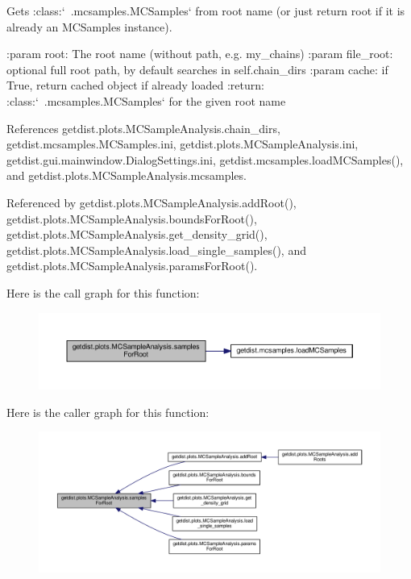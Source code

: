 \begin{DoxyVerb}Gets :class:`~.mcsamples.MCSamples` from root name (or just return root if it is already an MCSamples instance).

:param root: The root name (without path, e.g. my_chains)
:param file_root: optional full root path, by default searches in self.chain_dirs
:param cache: if True, return cached object if already loaded
:return: :class:`~.mcsamples.MCSamples` for the given root name
\end{DoxyVerb}
 

References getdist.\+plots.\+M\+C\+Sample\+Analysis.\+chain\+\_\+dirs, getdist.\+mcsamples.\+M\+C\+Samples.\+ini, getdist.\+plots.\+M\+C\+Sample\+Analysis.\+ini, getdist.\+gui.\+mainwindow.\+Dialog\+Settings.\+ini, getdist.\+mcsamples.\+load\+M\+C\+Samples(), and getdist.\+plots.\+M\+C\+Sample\+Analysis.\+mcsamples.



Referenced by getdist.\+plots.\+M\+C\+Sample\+Analysis.\+add\+Root(), getdist.\+plots.\+M\+C\+Sample\+Analysis.\+bounds\+For\+Root(), getdist.\+plots.\+M\+C\+Sample\+Analysis.\+get\+\_\+density\+\_\+grid(), getdist.\+plots.\+M\+C\+Sample\+Analysis.\+load\+\_\+single\+\_\+samples(), and getdist.\+plots.\+M\+C\+Sample\+Analysis.\+params\+For\+Root().

Here is the call graph for this function\+:
\nopagebreak
\begin{figure}[H]
\begin{center}
\leavevmode
\includegraphics[width=350pt]{classgetdist_1_1plots_1_1MCSampleAnalysis_a81c2af5210ee710151a4ea852312999c_cgraph}
\end{center}
\end{figure}
Here is the caller graph for this function\+:
\nopagebreak
\begin{figure}[H]
\begin{center}
\leavevmode
\includegraphics[width=350pt]{classgetdist_1_1plots_1_1MCSampleAnalysis_a81c2af5210ee710151a4ea852312999c_icgraph}
\end{center}
\end{figure}


